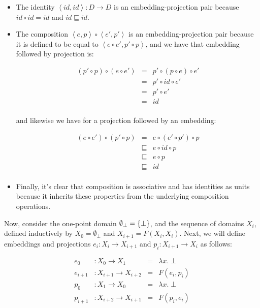 \begin{itemize}
\item The identity $\left<id, id\right> : D \to D$ is an 
embedding-projection pair because $id \circ id = id$ and 
$id \sqsubseteq id$. 

\item The composition $\left<e, p\right> \circ \left<e',
p'\right>$ is an embedding-projection pair because it 
is defined to be equal to $\left<e \circ e', p' \circ p\right>$, 
and we have that embedding followed by projection is:

\begin{displaymath}
  \begin{array}{lcl}
    (p' \circ p) \circ (e \circ e') 
       & = & p' \circ (p \circ e) \circ e' \\ 
       & = & p' \circ id \circ e' \\ 
       & = & p' \circ e' \\
       & = & id \\                 
  \end{array}
\end{displaymath}

and likewise we have for a projection followed by an embedding:

\begin{displaymath}
  \begin{array}{lcll}
    (e \circ e')  \circ (p' \circ p) 
       & = & e \circ (e' \circ p') \circ p \\
       & \sqsubseteq & e \circ id \circ p \\ 
       & \sqsubseteq & e \circ p \\
       & \sqsubseteq & id \\                 
  \end{array}
\end{displaymath}

\item Finally, it's clear that composition is associative and has
  identities as units because it inherits these properties from the
  underlying composition operations.
\end{itemize}


Now, consider the one-point domain $\emptyset_\bot = \{{\bot}\}$,
and the sequence of domains $X_i$, defined inductively by $X_0 =
\emptyset_\bot$ and $X_{i+1} = F(X_i, X_i)$. Next, we will define
embeddings and projections $e_i : X_i \to X_{i+1}$ and $p_i : X_{i+1}
\to X_i$ as follows:

\begin{displaymath}
  \begin{array}{llcl}
    e_0     & : X_0 \to X_1 & = &\lambda x.\; \bot \\
    e_{i+1} & : X_{i+1} \to X_{i+2} & = & F(e_i, p_i) \\[0.5em]
    p_0 &  : X_1 \to X_0 & = & \lambda x.\; \bot \\
    p_{i+1} & : X_{i+2} \to X_{i+1} & = & F(p_i, e_i) \\[0.5em]
  \end{array}
\end{displaymath}


